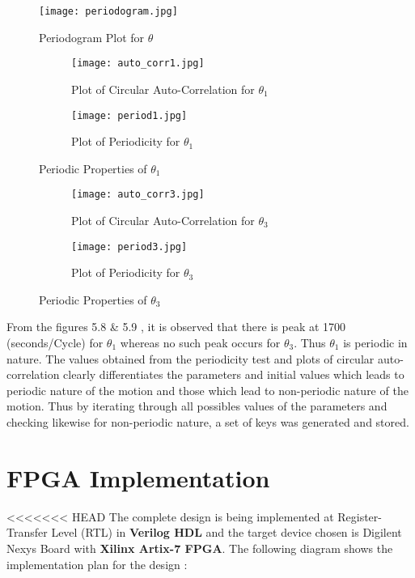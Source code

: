 \begin{figure}[H]
\centering
\texttt{[image: periodogram.jpg]}
\caption{Periodogram Plot for ${\theta}$}\label{fig:periodogram}
\end{figure}


\begin{figure}[H]
\begin{subfigure}{0.5\textwidth}
\texttt{[image: auto\_corr1.jpg]}
\caption{Plot of Circular Auto-Correlation for ${\theta_{1}}$}\label{fig:cir_auto1}
\end{subfigure}
\begin{subfigure}{0.5\textwidth}
\texttt{[image: period1.jpg]}
\caption{Plot of Periodicity for ${\theta_{1}}$}\label{fig:period1}
\end{subfigure}
\caption{Periodic Properties of ${\theta_{1}}$}\label{fig:image4}
\end{figure}

\begin{figure}[H]
\begin{subfigure}{0.5\textwidth}
\texttt{[image: auto\_corr3.jpg]}
\caption{Plot of Circular Auto-Correlation for ${\theta_{3}}$}\label{fig:cir_auto3}
\end{subfigure}
\begin{subfigure}{0.5\textwidth}
\texttt{[image: period3.jpg]}
\caption{Plot of Periodicity for ${\theta_{3}}$}\label{fig:period3}
\end{subfigure}
\caption{Periodic Properties of ${\theta_{3}}$}\label{fig:image5}
\end{figure}

From the figures 5.8 \& 5.9 , it is observed that there is peak at 1700 (seconds/Cycle) for $\theta_{1}$ whereas no such peak occurs for $\theta_{3}$. Thus $\theta_{1}$ is periodic in nature. The values obtained from the periodicity test and plots of circular auto-correlation clearly differentiates the parameters and initial values which leads to periodic nature of the motion and those which lead to non-periodic nature of the motion. Thus by iterating through all possibles values of the parameters and checking likewise for non-periodic nature, a set of keys was generated and stored. 


\section{FPGA Implementation}
<<<<<<< HEAD
The complete design is being implemented at Register-Transfer Level (RTL) in {\bf Verilog HDL} and the target device chosen is Digilent Nexys Board with {\bf Xilinx Artix-7 FPGA}. The following diagram shows the implementation plan for the design :

